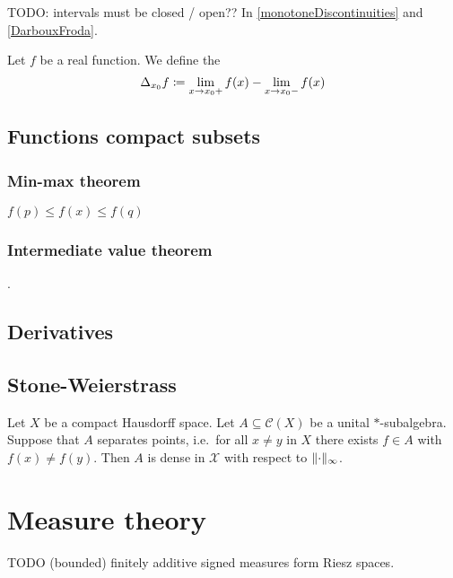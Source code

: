 TODO: intervals must be closed / open?? In \ref{monotoneDiscontinuities} and \ref{DarbouxFroda}.


\begin{definition}
Let $f$ be a real function. We define the 
\[ \Delta_{x_0}f \coloneqq \lim_{x\to x_0+} f(x) - \lim_{x\to x_0-} f(x) \]
\end{definition}

\section{Functions compact subsets}
\subsection{Min-max theorem} $f(p) \leq f(x) \leq f(q)$

\subsection{Intermediate value theorem}.

\section{Derivatives}

\section{Stone-Weierstrass}
\begin{theorem} \label{StoneWeierstrass}
Let $X$ be a compact Hausdorff space. Let $A\subseteq \mathcal{C}(X)$ be a unital $*$-subalgebra. Suppose that $A$ separates points, i.e.\ for all $x\neq y$ in $X$ there exists $f\in A$ with $f(x) \neq f(y)$. Then $A$ is dense in $\mathcal{X}$ with respect to $\lVert\cdot\rVert_\infty$.
\end{theorem}



\chapter{Measure theory}
TODO (bounded) finitely additive signed measures form Riesz spaces.
